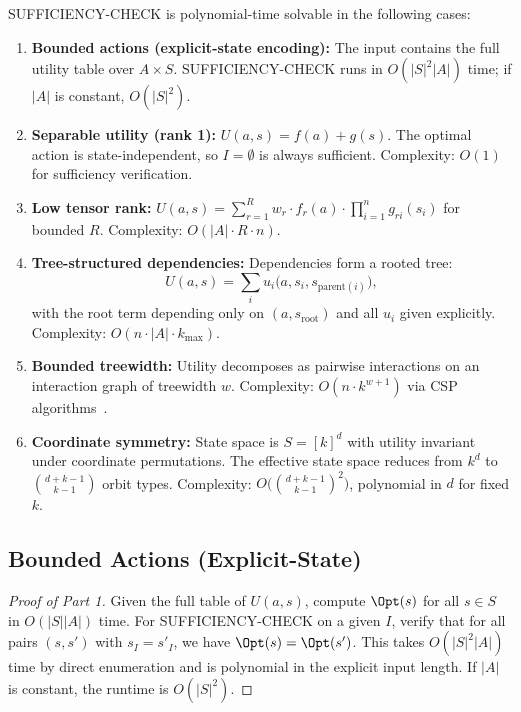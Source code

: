\begin{theorem}\label{thm:tractable}
SUFFICIENCY-CHECK is polynomial-time solvable in the following cases:
\begin{enumerate}
\item \textbf{Bounded actions (explicit-state encoding):} The input contains the full utility table over $A \times S$. SUFFICIENCY-CHECK runs in $O(|S|^2|A|)$ time; if $|A|$ is constant, $O(|S|^2)$.
\item \textbf{Separable utility (rank 1):} $U(a, s) = f(a) + g(s)$. The optimal action is state-independent, so $I = \emptyset$ is always sufficient. Complexity: $O(1)$ for sufficiency verification.
\item \textbf{Low tensor rank:} $U(a,s) = \sum_{r=1}^R w_r \cdot f_r(a) \cdot \prod_{i=1}^n g_{ri}(s_i)$ for bounded $R$. Complexity: $O(|A| \cdot R \cdot n)$.
\item \textbf{Tree-structured dependencies:} Dependencies form a rooted tree:
\[
U(a,s) = \sum_i u_i\bigl(a, s_i, s_{\mathrm{parent}(i)}\bigr),
\]
with the root term depending only on $(a, s_{\mathrm{root}})$ and all $u_i$ given explicitly. Complexity: $O(n \cdot |A| \cdot k_{\max})$.
\item \textbf{Bounded treewidth:} Utility decomposes as pairwise interactions on an interaction graph of treewidth $w$. Complexity: $O(n \cdot k^{w+1})$ via CSP algorithms~\cite{bodlaender1993tourist, freuder1990complexity}.
\item \textbf{Coordinate symmetry:} State space is $S = [k]^d$ with utility invariant under coordinate permutations. The effective state space reduces from $k^d$ to $\binom{d+k-1}{k-1}$ orbit types. Complexity: $O\bigl(\binom{d+k-1}{k-1}^2\bigr)$, polynomial in $d$ for fixed $k$.
\end{enumerate}
\end{theorem}

\subsection{Bounded Actions (Explicit-State)}

\begin{proof}[Proof of Part 1]
Given the full table of $U(a,s)$, compute $\Opt(s)$ for all $s \in S$ in $O(|S||A|)$ time. For SUFFICIENCY-CHECK on a given $I$, verify that for all pairs $(s,s')$ with $s_I = s'_I$, we have $\Opt(s) = \Opt(s')$. This takes $O(|S|^2|A|)$ time by direct enumeration and is polynomial in the explicit input length. If $|A|$ is constant, the runtime is $O(|S|^2)$.
\end{proof}

